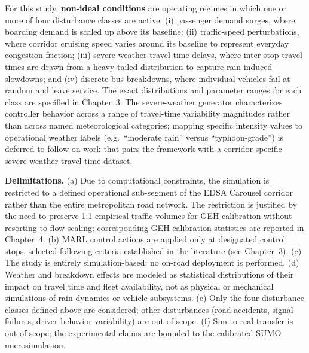 For this study, \textbf{non-ideal conditions} are operating regimes in which one or more of four disturbance classes are active: (i) passenger demand surges, where boarding demand is scaled up above its baseline; (ii) traffic-speed perturbations, where corridor cruising speed varies around its baseline to represent everyday congestion friction; (iii) severe-weather travel-time delays, where inter-stop travel times are drawn from a heavy-tailed distribution to capture rain-induced slowdowns; and (iv) discrete bus breakdowns, where individual vehicles fail at random and leave service. The exact distributions and parameter ranges for each class are specified in Chapter~3. The severe-weather generator characterizes controller behavior across a range of travel-time variability magnitudes rather than across named meteorological categories; mapping specific intensity values to operational weather labels (e.g.\ ``moderate rain'' versus ``typhoon-grade'') is deferred to follow-on work that pairs the framework with a corridor-specific severe-weather travel-time dataset.

\textbf{Delimitations.} (a) Due to computational constraints, the simulation is restricted to a defined operational sub-segment of the EDSA Carousel corridor rather than the entire metropolitan road network. The restriction is justified by the need to preserve 1:1 empirical traffic volumes for GEH calibration without resorting to flow scaling; corresponding GEH calibration statistics are reported in Chapter~4. (b) MARL control actions are applied only at designated control stops, selected following criteria established in the literature (see Chapter~3). (c) The study is entirely simulation-based; no on-road deployment is performed. (d) Weather and breakdown effects are modeled as statistical distributions of their impact on travel time and fleet availability, not as physical or mechanical simulations of rain dynamics or vehicle subsystems. (e) Only the four disturbance classes defined above are considered; other disturbances (road accidents, signal failures, driver behavior variability) are out of scope. (f) Sim-to-real transfer is out of scope; the experimental claims are bounded to the calibrated SUMO microsimulation.